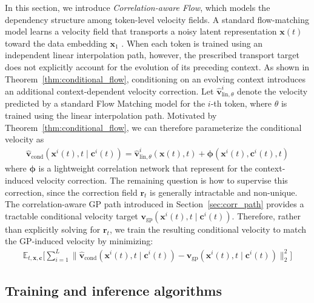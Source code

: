 \documentclass{article} %
\begin{document}
In this section, we introduce \emph{Correlation-aware Flow}, which models the dependency structure among token-level velocity fields. A standard flow-matching model learns a velocity field that transports a noisy latent representation $\mathbf{x}(t)$ toward the data embedding $\mathbf{x}_1$ \citep{lipman2023flowmatching}. When each token is trained using an independent linear interpolation path, however, the prescribed transport target does not explicitly account for the evolution of its preceding context. As shown in Theorem~\ref{thm:conditional_flow}, conditioning on an evolving context introduces an additional context-dependent velocity correction. Let $\hat{\mathbf{v}}_{\text{lin},\theta}^{i}$ denote the velocity predicted by a standard Flow Matching model for the $i$-th token, where $\theta$ is trained using the linear interpolation path. Motivated by Theorem~\ref{thm:conditional_flow}, we can therefore parameterize the conditional velocity  as 
\begin{eqnarray}
    \hat{\mathbf{v}}_{\text{cond}} (\mathbf{x}^i(t),t  \mid \mathbf{c}^{i}(t)) = \hat{\mathbf{v}}^{i}_{\text{lin},\theta} (\mathbf{x}(t), t) + \boldsymbol{\phi}(\mathbf{x}^i(t), \mathbf{c}^i(t) ,t) \label{eq:v_cond_predict_0}
\end{eqnarray}
where $\boldsymbol{\phi}$ is a lightweight correlation network that represent for the context-induced velocity correction. The remaining question is how to supervise this correction, since the correction field $\mathbf{r}_t$ is generally intractable and non-unique. The correlation-aware GP path introduced in Section~\ref{sec:corr_path} provides a tractable conditional velocity target $\mathbf{v}_{\mathrm{gp}}(\mathbf{x}^i(t), t \mid \mathbf{c}^i(t))$. Therefore, rather than explicitly solving for $\mathbf{r}_t$, we train the resulting conditional velocity to match the GP-induced velocity by minimizing:
\begin{eqnarray}
     \mathbb{E}_{t, \mathbf{x}, \mathbf{c}} \Big[\sum_{i=1}^{L} \| \hat{\mathbf{v}}_{\text{cond}} (\mathbf{x}^i(t),t  \mid \mathbf{c}^{i}(t)) - \mathbf{v}_{\mathrm{gp}}(\mathbf{x}^i(t), t \mid \mathbf{c}^i(t))\|^2_2\Big] \nonumber
\end{eqnarray}

\subsection{Training and inference algorithms}
\label{sec:algorithm}
\end{document}
